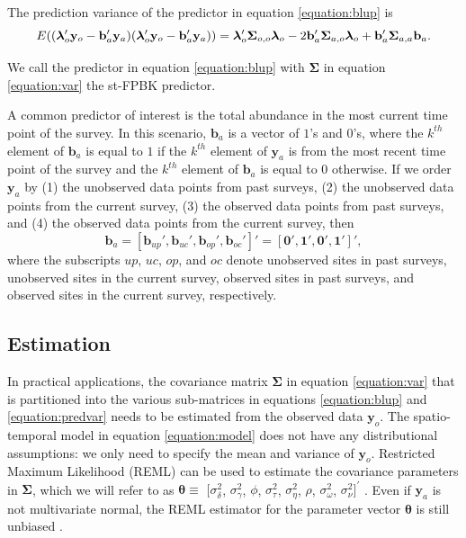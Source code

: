 \documentclass[]{interact}
\theoremstyle{plain}%
\theoremstyle{definition}
\theoremstyle{remark}
\begin{document}
The prediction variance of the predictor in equation \ref{equation:blup}
is \mbox{} \begin{equation} \label{equation:predvar}
E((\bm{\lambda}_o'\mathbf{y}_o - \mathbf{b}_a'\mathbf{y}_a)(\bm{\lambda}_o'\mathbf{y}_o - \mathbf{b}_a'\mathbf{y}_a)) = \\
\bm{\lambda}_o'\bm{\Sigma}_{o, o}\bm{\lambda}_o - 2 \mathbf{b}_a' \bm{\Sigma}_{a, o} \bm{\lambda}_o + \mathbf{b}_a' \bm{\Sigma}_{a, a} \mathbf{b}_a.
\end{equation}

\noindent We call the predictor in equation \ref{equation:blup} with
\(\bm{\Sigma}\) in equation \ref{equation:var} the st-FPBK predictor.

A common predictor of interest is the total abundance in the most
current time point of the survey. In this scenario, \(\mathbf{b}_a\) is
a vector of \(1\)'s and \(0\)'s, where the \(k^{th}\) element of
\(\mathbf{b}_a\) is equal to \(1\) if the \(k^{th}\) element of
\(\mathbf{y}_a\) is from the most recent time point of the survey and
the \(k^{th}\) element of \(\mathbf{b}_a\) is equal to 0 otherwise. If
we order \(\mathbf{y}_a\) by (1) the unobserved data points from past
surveys, (2) the unobserved data points from the current survey, (3) the
observed data points from past surveys, and (4) the observed data points
from the current survey, then \mbox{}
\begin{equation} \label{equation:currentweights}
\mathbf{b}_a = [\mathbf{b}_{up}', \mathbf{b}_{uc}', \mathbf{b}_{op}', \mathbf{b}_{oc}']' = [\mathbf{0}', \mathbf{1}', \mathbf{0}', \mathbf{1}']',
\end{equation} \noindent where the subscripts \(up\), \(uc\), \(op\),
and \(oc\) denote unobserved sites in past surveys, unobserved sites in
the current survey, observed sites in past surveys, and observed sites
in the current survey, respectively.

\subsection{Estimation}

In practical applications, the covariance matrix \(\bm{\Sigma}\) in
equation \ref{equation:var} that is partitioned into the various
sub-matrices in equations \ref{equation:blup} and \ref{equation:predvar}
needs to be estimated from the observed data \(\mathbf{y}_o\). The
spatio-temporal model in equation \ref{equation:model} does not have any
distributional assumptions: we only need to specify the mean and
variance of \(\mathbf{y}_o\). Restricted Maximum Likelihood (REML) can
be used to estimate the covariance parameters in \(\bm{\Sigma}\), which
we will refer to as \(\bm{\theta} \equiv\) \([\sigma^2_{\delta}\),
\(\sigma^2_{\gamma}\), \(\phi\), \(\sigma^2_{\tau}\),
\(\sigma^2_{\eta}\), \(\rho\), \(\sigma^2_{\omega}\),
\(\sigma^2_{\nu}]^\prime\)
\citep{patterson1971recovery, harville1977maximum}. Even if
\(\mathbf{y}_a\) is not multivariate normal, the REML estimator for the
parameter vector \(\bm{\theta}\) is still unbiased
\citep{heyde1994quasi, cressie1993asymptotic}.
\end{document}
